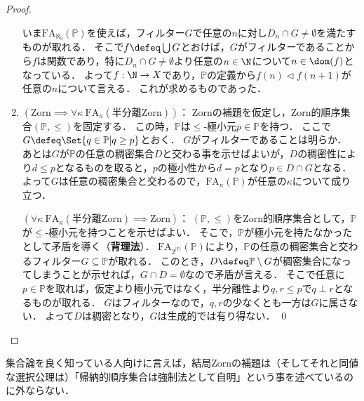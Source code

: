 \documentclass[a4j,leqno]{ltjsarticle}
\newcommand{\Zorn}{\mathrm{Zorn}}
\newcommand{\FA}{\mathrm{FA}}
\renewcommand{\emph}[1]{\textbf{\textsf{#1}}}
\begin{document}
\begin{proof}
\begin{enumerate}
        いま$\FA_{\aleph_0}(\mathbb{P})$を使えば，フィルター$G$で任意の$n$に対し$D_n \cap G \neq \emptyset$を満たすものが取れる．
        そこで$f \defeq \bigcup G$とおけば，$G$がフィルターであることから$f$は関数であり，特に$D_n \cap G \neq \emptyset$より任意の$n \in \N$について$n \in \dom(f)$となっている．
        よって$f: \N \to X$であり，$\mathbb{P}$の定義から$f(n) \lhd f(n+1)$が任意の$n$について言える．
        これが求めるものであった．

  \item $(\Zorn \implies \forall \kappa\: \FA_\kappa(\text{半分離}\Zorn))$：
        $\Zorn$の補題を仮定し，Zorn的順序集合$(\mathbb{P}, {\leq})$を固定する．
        この時，$\mathbb{P}$は$\leq$-極小元$p \in \mathbb{P}$を持つ．
        ここで$G \defeq \Set{q \in \mathbb{P} | q \geq p}$とおく．
        $G$がフィルターであることは明らか．
        あとは$G$が$\mathbb{P}$の任意の稠密集合$D$と交わる事を示せばよいが，$D$の稠密性により$d \leq p$となるものを取ると，$p$の極小性から$d = p$となり$p \in D \cap G$となる．
        よって$G$は任意の稠密集合と交わるので，$\FA_\kappa(\mathbb{P})$が任意の$\kappa$について成り立つ．

        $(\forall \kappa\: \FA_\kappa(\text{半分離}\Zorn) \implies \Zorn)$：
        $(\mathbb{P}, \leq)$をZorn的順序集合として，$\mathbb{P}$が$\leq$-極小元を持つことを示せばよい．
        そこで，$\mathbb{P}$が極小元を持たなかったとして矛盾を導く（\emph{背理法}）．
        $\FA_{2^{\lvert\mathbb{P}\rvert}}(\mathbb{P})$により，$\mathbb{P}$の任意の稠密集合と交わるフィルター$G \subseteq \mathbb{P}$が取れる．
        このとき，$D \defeq \mathbb{P} \setminus G$が稠密集合になってしまうことが示せれば，$G \cap D = \emptyset$なので矛盾が言える．
        そこで任意に$p \in \mathbb{P}$を取れば，仮定より極小元ではなく，半分離性より$q, r \leq p$で$q \perp r$となるものが取れる．
        $G$はフィルターなので，$q, r$の少なくとも一方は$G$に属さない．
        よって$D$は稠密となり，$G$は生成的では有り得ない． \qed
 \end{enumerate}
\end{proof}

\begin{remark}
 集合論を良く知っている人向けに言えば，結局Zornの補題は（そしてそれと同値な選択公理は）「帰納的順序集合は強制法として自明」という事を述べているのに外ならない．
\end{remark}
\end{document}
